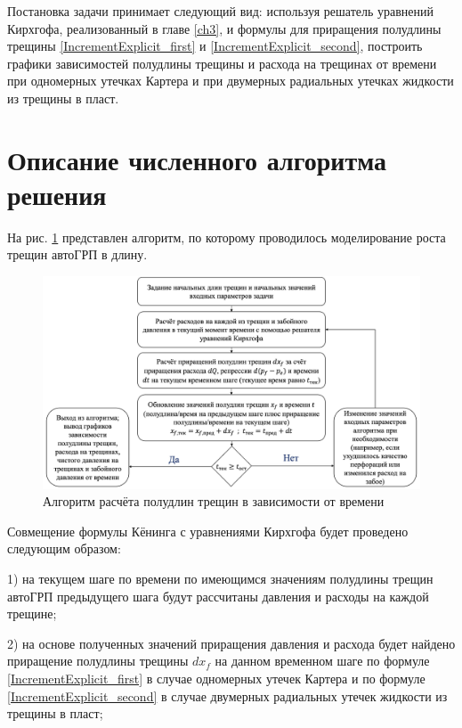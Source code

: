 Постановка задачи принимает следующий вид: используя решатель уравнений Кирхгофа, реализованный в главе \ref{ch3}, и формулы для приращения полудлины трещины \eqref{IncrementExplicit_first} и \eqref{IncrementExplicit_second}, построить графики зависимостей полудлины трещины и расхода на трещинах от времени при одномерных утечках Картера и при двумерных радиальных утечках жидкости из трещины в пласт.

\section{Описание численного алгоритма решения}
\vspace*{-5mm}

На рис. \ref{fig:koning_scheme} представлен алгоритм, по которому проводилось моделирование роста трещин автоГРП в длину.

\begin{figure}[H] 
\center
\includegraphics[width=\linewidth]{images/Koning_scheme.jpg}
\caption{Алгоритм расчёта полудлин трещин в зависимости от времени} 
\label{fig:koning_scheme}
\end{figure}

Совмещение формулы Кёнинга с уравнениями Кирхгофа будет проведено следующим образом:

1) на текущем шаге по времени по имеющимся значениям полудлины трещин автоГРП предыдущего шага будут рассчитаны давления и расходы на каждой трещине;

2) на основе полученных значений приращения давления и расхода будет найдено приращение полудлины трещины $dx_{\!f}$ на данном временном шаге по формуле \eqref{IncrementExplicit_first} в случае одномерных утечек Картера и по формуле \eqref{IncrementExplicit_second} в случае двумерных радиальных утечек жидкости из трещины в пласт;

